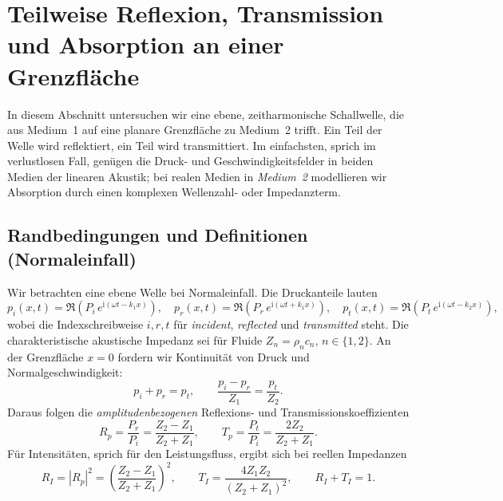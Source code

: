%
%
%
%
\section{Teilweise Reflexion, Transmission und Absorption an einer Grenzfläche
\label{schall:section:teil2}}

In diesem Abschnitt untersuchen wir eine ebene, zeit\-harmonische Schallwelle,
die aus Medium~1 auf eine planare Grenzfläche zu Medium~2 trifft.
Ein Teil der Welle wird reflektiert, ein Teil wird transmittiert.
Im einfachsten, sprich im verlustlosen Fall, genügen die Druck- und
Geschwindigkeitsfelder in beiden Medien der linearen Akustik;
bei realen Medien in \emph{Medium~2} modellieren wir Absorption durch
einen komplexen Wellenzahl- oder Impedanzterm.
\blindtext{}

\subsection{Randbedingungen und Definitionen (Normal\-einfall)}
Wir betrachten eine ebene Welle bei Normal\-einfall.
Die Druckanteile lauten
\[
    p_i(x,t)=\Re( P_i\,e^{\mathrm{i}(\omega t-k_1 x)}),\quad
    p_r(x,t)=\Re( P_r\,e^{\mathrm{i}(\omega t+k_1 x)}),\quad
    p_t(x,t)=\Re( P_t\,e^{\mathrm{i}(\omega t-k_2 x)}),
\]
wobei die Indexschreibweise $i,r,t$ für \emph{incident}, \emph{reflected} und \emph{transmitted} steht.
Die charakteristische akustische Impedanz sei für Fluide $Z_n=\rho_n c_n$, $n\in\{1,2\}$.
An der Grenzfläche $x=0$ fordern wir Kontinuität von Druck und Normalgeschwindigkeit:
\[
    p_i+p_r=p_t,\qquad \frac{p_i-p_r}{Z_1}=\frac{p_t}{Z_2}.
\]
Daraus folgen die \emph{amplitudenbezogenen} Reflexions- und Transmissionskoeffizienten
\begin{equation}
    R_p=\frac{P_r}{P_i}=\frac{Z_2-Z_1}{Z_2+Z_1},
    \qquad
    T_p=\frac{P_t}{P_i}=\frac{2Z_2}{Z_2+Z_1}.
    \label{eq:RpTp}
\end{equation}
Für Intensitäten, sprich für den Leistungsfluss, ergibt sich bei reellen Impedanzen \cite{schall:kinsler, schall:allenRT}
\begin{equation}
    R_I=\left|R_p\right|^2=\left(\frac{Z_2-Z_1}{Z_2+Z_1}\right)^2,\qquad
    T_I=\frac{4Z_1Z_2}{(Z_2+Z_1)^2},
    \qquad
    R_I+T_I=1.
    \label{eq:RI_TI}
\end{equation}
\blindtext{}

